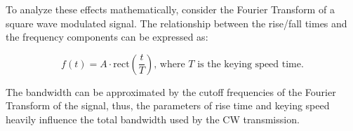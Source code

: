 To analyze these effects mathematically, consider the Fourier Transform of a square wave modulated signal. The relationship between the rise/fall times and the frequency components can be expressed as:

\[
f(t) = A \cdot \text{rect}\left( \frac{t}{T} \right) \text{, where } T \text{ is the keying speed time.}
\]

The bandwidth can be approximated by the cutoff frequencies of the Fourier Transform of the signal, thus, the parameters of rise time and keying speed heavily influence the total bandwidth used by the CW transmission.


